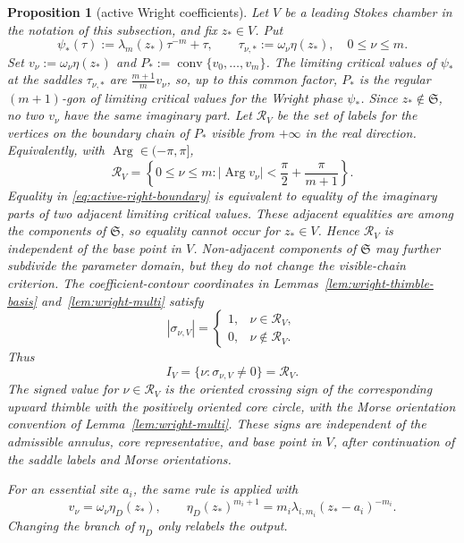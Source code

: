 \documentclass[10pt,a4paper]{amsart}
\newtheorem{prop}{Proposition}
\begin{document}
\begin{prop}[active Wright coefficients]\label{prop:active-wright-coefficients}
Let $V$ be a leading Stokes chamber in the notation of this subsection, and fix $z_\ast\in V$. Put
\[
\psi_\ast(\tau):=\lambda_m(z_\ast)\tau^{-m}+\tau,
\qquad
\tau_{\nu,\ast}:=\omega_\nu\eta(z_\ast),\quad 0\le\nu\le m.
\]
Set $v_\nu:=\omega_\nu\eta(z_\ast)$ and $P_\ast:=\operatorname{conv}\{v_0,\ldots,v_m\}$. The limiting critical values of $\psi_\ast$ at the saddles $\tau_{\nu,\ast}$ are $\frac{m+1}{m}v_\nu$, so, up to this common factor, $P_\ast$ is the regular $(m+1)$-gon of limiting critical values for the Wright phase $\psi_\ast$. Since $z_\ast\notin\mathfrak S$, no two $v_\nu$ have the same imaginary part. Let $\mathcal R_V$ be the set of labels for the vertices on the boundary chain of $P_\ast$ visible from $+\infty$ in the real direction. Equivalently, with $\operatorname{Arg}\in(-\pi,\pi]$,
\begin{equation}\label{eq:active-right-boundary}
\mathcal R_V=
\left\{0\le\nu\le m:
\left|\operatorname{Arg} v_\nu\right|<
\frac{\pi}{2}+\frac{\pi}{m+1}\right\}.
\end{equation}
Equality in \eqref{eq:active-right-boundary} is equivalent to equality of the imaginary parts of two adjacent limiting critical values. These adjacent equalities are among the components of \(\mathfrak S\), so equality cannot occur for \(z_\ast\in V\). Hence \(\mathcal R_V\) is independent of the base point in \(V\). Non-adjacent components of \(\mathfrak S\) may further subdivide the parameter domain, but they do not change the visible-chain criterion. The coefficient-contour coordinates in Lemmas~\ref{lem:wright-thimble-basis} and~\ref{lem:wright-multi} satisfy
\[
|\sigma_{\nu,V}|=
\begin{cases}
1, & \nu\in\mathcal R_V,\\
0, & \nu\notin\mathcal R_V.
\end{cases}
\]
Thus
\[
I_V=\{\nu:\sigma_{\nu,V}\ne0\}=\mathcal R_V.
\]
The signed value for $\nu\in\mathcal R_V$ is the oriented crossing sign of the corresponding upward thimble with the positively oriented core circle, with the Morse orientation convention of Lemma~\ref{lem:wright-multi}. These signs are independent of the admissible annulus, core representative, and base point in $V$, after continuation of the saddle labels and Morse orientations.

For an essential site $a_i$, the same rule is applied with
\[
v_\nu=\omega_\nu\eta_D(z_\ast),
\qquad
\eta_D(z_\ast)^{m_i+1}=m_i\lambda_{i,m_i}(z_\ast-a_i)^{-m_i}.
\]
Changing the branch of $\eta_D$ only relabels the output.
\end{prop}
\end{document}
